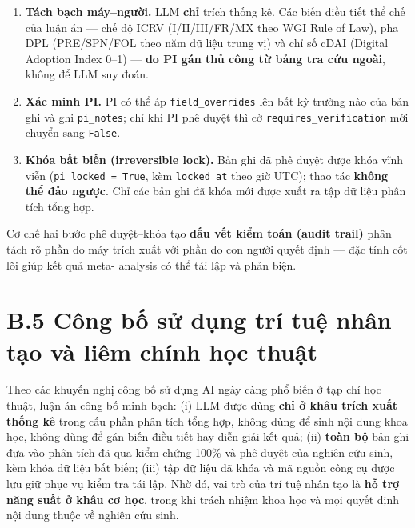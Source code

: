 \documentclass[
  a4paper,
  13pt]{extreport}
\providecommand{\tightlist}{%
  \setlength{\itemsep}{0pt}\setlength{\parskip}{0pt}}
\begin{document}
\begin{enumerate}
\def\labelenumi{\arabic{enumi}.}
\tightlist
\item
  \textbf{Tách bạch máy--người.} LLM \textbf{chỉ} trích thống kê. Các
  biến điều tiết thể chế của luận án --- chế độ ICRV (I/II/III/FR/MX
  theo WGI Rule of Law), pha DPL (PRE/SPN/FOL theo năm dữ liệu trung vị)
  và chỉ số cDAI (Digital Adoption Index 0--1) --- \textbf{do PI gán thủ
  công từ bảng tra cứu ngoài}, không để LLM suy đoán.
\item
  \textbf{Xác minh PI.} PI có thể áp \texttt{field\_overrides} lên bất
  kỳ trường nào của bản ghi và ghi \texttt{pi\_notes}; chỉ khi PI phê
  duyệt thì cờ \texttt{requires\_verification} mới chuyển sang
  \texttt{False}.
\item
  \textbf{Khóa bất biến (irreversible lock).} Bản ghi đã phê duyệt được
  khóa vĩnh viễn (\texttt{pi\_locked\ =\ True}, kèm \texttt{locked\_at}
  theo giờ UTC); thao tác \textbf{không thể đảo ngược}. Chỉ các bản ghi
  đã khóa mới được xuất ra tập dữ liệu phân tích tổng hợp.
\end{enumerate}

Cơ chế hai bước phê duyệt--khóa tạo \textbf{dấu vết kiểm toán (audit
trail)} phân tách rõ phần do máy trích xuất với phần do con người quyết
định --- đặc tính cốt lõi giúp kết quả meta- analysis có thể tái lập và
phản biện.

\hypertarget{b.5-cuxf4ng-bux1ed1-sux1eed-dux1ee5ng-truxed-tuux1ec7-nhuxe2n-tux1ea1o-vuxe0-liuxeam-chuxednh-hux1ecdc-thuux1eadt}{%
\section{B.5 Công bố sử dụng trí tuệ nhân tạo và liêm chính học
thuật}\label{b.5-cuxf4ng-bux1ed1-sux1eed-dux1ee5ng-truxed-tuux1ec7-nhuxe2n-tux1ea1o-vuxe0-liuxeam-chuxednh-hux1ecdc-thuux1eadt}}

Theo các khuyến nghị công bố sử dụng AI ngày càng phổ biến ở tạp chí học
thuật, luận án công bố minh bạch: (i) LLM được dùng \textbf{chỉ ở khâu
trích xuất thống kê} trong cấu phần phân tích tổng hợp, không dùng để
sinh nội dung khoa học, không dùng để gán biến điều tiết hay diễn giải
kết quả; (ii) \textbf{toàn bộ} bản ghi đưa vào phân tích đã qua kiểm
chứng 100\% và phê duyệt của nghiên cứu sinh, kèm khóa dữ liệu bất biến;
(iii) tập dữ liệu đã khóa và mã nguồn công cụ được lưu giữ phục vụ kiểm
tra tái lập. Nhờ đó, vai trò của trí tuệ nhân tạo là \textbf{hỗ trợ năng
suất ở khâu cơ học}, trong khi trách nhiệm khoa học và mọi quyết định
nội dung thuộc về nghiên cứu sinh.
\end{document}
